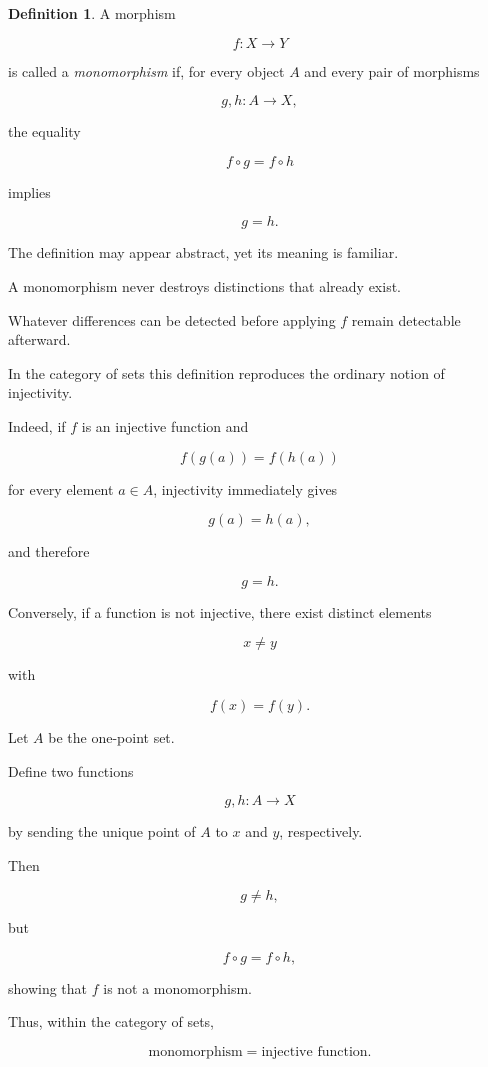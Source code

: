 \documentclass[11pt]{book}
\numberwithin{equation}{chapter}
\theoremstyle{definition}
\newtheorem{definition}{Definition}[chapter]
\theoremstyle{plain}
\theoremstyle{remark}
\begin{document}
\begin{definition}
A morphism

\[
f:X\rightarrow Y
\]

is called a \emph{monomorphism} if, for every object \(A\) and every pair of morphisms

\[
g,h:A\rightarrow X,
\]

the equality

\[
f\circ g
=
f\circ h
\]

implies

\[
g=h.
\]
\end{definition}

The definition may appear abstract, yet its meaning is familiar.

A monomorphism never destroys distinctions that already exist.

Whatever differences can be detected before applying \(f\) remain detectable afterward.

In the category of sets this definition reproduces the ordinary notion of injectivity.

Indeed, if \(f\) is an injective function and

\[
f(g(a))
=
f(h(a))
\]

for every element \(a\in A\), injectivity immediately gives

\[
g(a)=h(a),
\]

and therefore

\[
g=h.
\]

Conversely, if a function is not injective, there exist distinct elements

\[
x\neq y
\]

with

\[
f(x)=f(y).
\]

Let \(A\) be the one-point set.

Define two functions

\[
g,h:A\rightarrow X
\]

by sending the unique point of \(A\) to \(x\) and \(y\), respectively.

Then

\[
g\neq h,
\]

but

\[
f\circ g
=
f\circ h,
\]

showing that \(f\) is not a monomorphism.

Thus, within the category of sets,

\[
\boxed{
\text{monomorphism}
=
\text{injective function}.
}
\]
\end{document}
